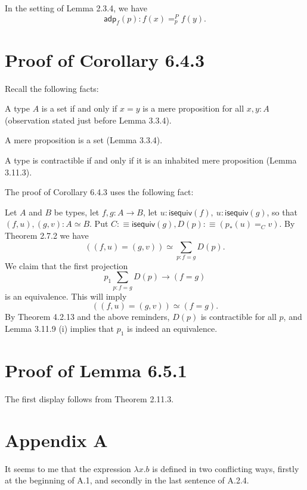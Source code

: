 \documentclass[12pt]{article}
\newcommand{\msf}{\mathsf}
\begin{document}
In the setting of Lemma 2.3.4, we have 
$$
\msf{adp}_f(p):f(x)=^P_pf(y).
$$


\section{Proof of Corollary 6.4.3}

Recall the following facts: 

A type $A$ is a set if and only if $x=y$ is a mere proposition for all $x,y:A$ (observation stated just before Lemma 3.3.4). 

A mere proposition is a set (Lemma 3.3.4).

A type is contractible if and only if it is an inhabited mere proposition (Lemma 3.11.3). 

The proof of Corollary 6.4.3 uses the following fact:

Let $A$ and $B$ be types, let $f,g:A\to B$, let $u:\mathsf{isequiv}(f),\ u:\mathsf{isequiv}(g)$, so that $(f,u),(g,v):A\simeq B$. Put $C:\equiv\mathsf{isequiv}(g), D(p):\equiv(p_*(u)=_Cv)$. By Theorem 2.7.2 we have 
$$
((f,u)=(g,v))\simeq\sum_{p:f=g}D(p).
$$ 
We claim that the first projection 
$$
p_1\sum_{p:f=g}D(p)\to(f=g)
$$ 
is an equivalence. This will imply 
$$
((f,u)=(g,v))\simeq(f=g).
$$ 
By Theorem 4.2.13 and the above reminders, $D(p)$ is contractible for all $p$, and Lemma 3.11.9 (i) implies that $p_1$ is indeed an equivalence.


\section{Proof of Lemma 6.5.1}

The first display follows from Theorem 2.11.3.


\section{Appendix A}

It seems to me that the expression $\lambda x.b$ is defined in two conflicting ways, firstly at the beginning of A.1, and secondly in the last sentence of A.2.4. 
\end{document}
